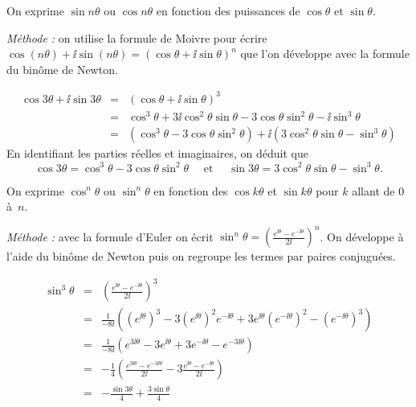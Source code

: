 \documentclass[class=report,crop=false]{standalone}
\begin{document}
\bigskip




 On exprime $\sin n \theta$ ou $\cos n \theta$ en
fonction des puissances de $\cos \theta$ et $\sin \theta$.

\medskip

\emph{Méthode :} on utilise la formule de Moivre pour écrire $\cos \left( n
\theta \right) + \ii  \sin \left( n \theta \right) = \left( \cos \theta + \ii  \sin
\theta \right)^n$ que l'on développe avec la formule du bin\^ome de Newton.

\begin{exemple}
\begin{eqnarray*}
  \cos 3 \theta + \ii  \sin 3 \theta & = & \left( \cos \theta + \ii  \sin \theta
  \right)^3\\
  & = & \cos^3 \theta + 3 \ii  \cos^2 \theta \sin \theta - 3 \cos \theta \sin^2
  \theta - \ii  \sin^3 \theta\\
  & = & \left( \cos^3 \theta - 3 \cos \theta \sin^2 \theta \right) + \ii  \left(
  3 \cos^2 \theta \sin \theta - \sin^3 \theta \right)
\end{eqnarray*}
En identifiant les parties réelles et imaginaires, on déduit que
\[ \cos 3 \theta = \cos^3 \theta - 3 \cos \theta \sin^2 \theta \quad \text{ et } \quad
   \sin 3 \theta = 3 \cos^2 \theta \sin \theta - \sin^3 \theta . \]
\end{exemple}

\bigskip

  On exprime
$\cos^n \theta$ ou $\sin^n \theta$ en fonction des $\cos k \theta$ et $\sin k
\theta$ pour $k$ allant de $0$ \`a~$n$.

\medskip

\emph{Méthode :} avec la formule d'Euler on écrit $\sin^n \theta = \left( \frac{e^{\ii
\theta} - e^{- \ii  \theta}}{2 \ii } \right)^n$. On développe à l'aide du binôme de Newton
puis on regroupe les termes par paires conjugu\'ees.

\begin{exemple}
\begin{eqnarray*}
  \sin^3 \theta & = & \left( \frac{e^{\ii  \theta} - e^{- \ii  \theta}}{2 \ii }
  \right)^3 \\
 & = & \frac{1}{- 8 \ii }  \left( (e^{\ii  \theta})^3 - 3 (e^{\ii  \theta})^2e^{- \ii  \theta}
+ 3 e^{\ii  \theta}(e^{-\ii  \theta})^2 - (e^{- \ii  \theta})^3 \right)\\
& = & \frac{1}{- 8 \ii }  \left( e^{3 \ii  \theta} - 3 e^{\ii  \theta} + 3 e^{-
  \ii  \theta} - e^{- 3 \ii  \theta} \right)\\
  & = & - \frac{1}{4} \left( \frac{e^{3 \ii  \theta} -  e^{-3 \ii \theta}}{2 \ii } - 3
  \frac{e^{\ii  \theta} - e^{-\ii  \theta}}{2 \ii } \right) \\
& = & - \frac{\sin 3 \theta}{4}
  + \frac{3 \sin \theta}{4}
\end{eqnarray*}
\end{exemple}
\end{document}
